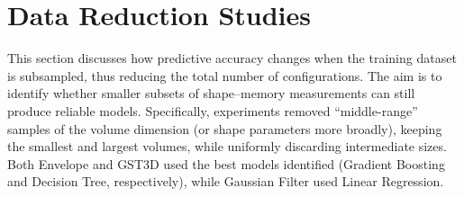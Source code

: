 
\section{Data Reduction Studies}
\label{sec:pmc-results-data-reduction-studies}

This section discusses how predictive accuracy changes when the training dataset is subsampled, thus reducing the total number of configurations.
The aim is to identify whether smaller subsets of shape–memory measurements can still produce reliable models.
Specifically, experiments removed “middle-range” samples of the volume dimension (or shape parameters more broadly), keeping the smallest and largest volumes, while uniformly discarding intermediate sizes.
Both Envelope and \ac{GST3D} used the best models identified (Gradient Boosting and Decision Tree, respectively), while Gaussian Filter used Linear Regression.

